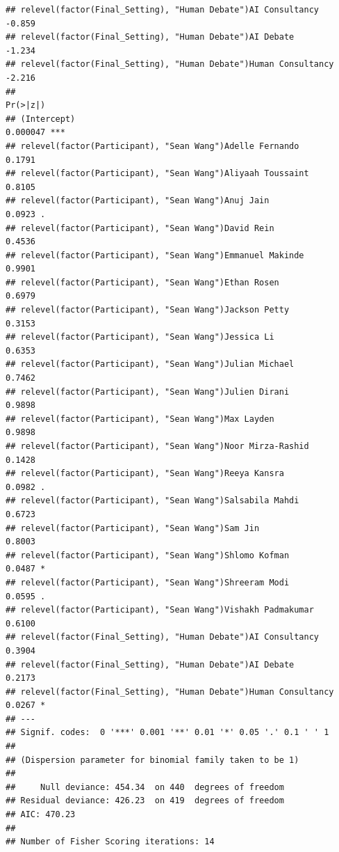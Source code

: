 \documentclass[
]{article}
\begin{document}
\begin{verbatim}
## relevel(factor(Final_Setting), "Human Debate")AI Consultancy     -0.859
## relevel(factor(Final_Setting), "Human Debate")AI Debate          -1.234
## relevel(factor(Final_Setting), "Human Debate")Human Consultancy  -2.216
##                                                                 Pr(>|z|)    
## (Intercept)                                                     0.000047 ***
## relevel(factor(Participant), "Sean Wang")Adelle Fernando          0.1791    
## relevel(factor(Participant), "Sean Wang")Aliyaah Toussaint        0.8105    
## relevel(factor(Participant), "Sean Wang")Anuj Jain                0.0923 .  
## relevel(factor(Participant), "Sean Wang")David Rein               0.4536    
## relevel(factor(Participant), "Sean Wang")Emmanuel Makinde         0.9901    
## relevel(factor(Participant), "Sean Wang")Ethan Rosen              0.6979    
## relevel(factor(Participant), "Sean Wang")Jackson Petty            0.3153    
## relevel(factor(Participant), "Sean Wang")Jessica Li               0.6353    
## relevel(factor(Participant), "Sean Wang")Julian Michael           0.7462    
## relevel(factor(Participant), "Sean Wang")Julien Dirani            0.9898    
## relevel(factor(Participant), "Sean Wang")Max Layden               0.9898    
## relevel(factor(Participant), "Sean Wang")Noor Mirza-Rashid        0.1428    
## relevel(factor(Participant), "Sean Wang")Reeya Kansra             0.0982 .  
## relevel(factor(Participant), "Sean Wang")Salsabila Mahdi          0.6723    
## relevel(factor(Participant), "Sean Wang")Sam Jin                  0.8003    
## relevel(factor(Participant), "Sean Wang")Shlomo Kofman            0.0487 *  
## relevel(factor(Participant), "Sean Wang")Shreeram Modi            0.0595 .  
## relevel(factor(Participant), "Sean Wang")Vishakh Padmakumar       0.6100    
## relevel(factor(Final_Setting), "Human Debate")AI Consultancy      0.3904    
## relevel(factor(Final_Setting), "Human Debate")AI Debate           0.2173    
## relevel(factor(Final_Setting), "Human Debate")Human Consultancy   0.0267 *  
## ---
## Signif. codes:  0 '***' 0.001 '**' 0.01 '*' 0.05 '.' 0.1 ' ' 1
## 
## (Dispersion parameter for binomial family taken to be 1)
## 
##     Null deviance: 454.34  on 440  degrees of freedom
## Residual deviance: 426.23  on 419  degrees of freedom
## AIC: 470.23
## 
## Number of Fisher Scoring iterations: 14
\end{verbatim}
\end{document}
